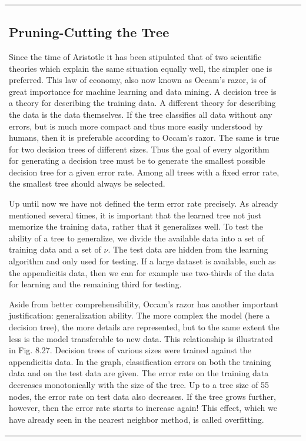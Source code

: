 \documentclass[10pt]{book}
\begin{document}
\begin{center}
\begin{tabular}{|l|l|l|}
\subsection{Pruning-Cutting the Tree}
Since the time of Aristotle it has been stipulated that of two scientific theories which explain the same situation equally well, the simpler one is preferred. This law of economy, also now known as Occam's razor, is of great importance for machine learning and data mining.
A decision tree is a theory for describing the training data. A different theory for describing the data is the data themselves. If the tree classifies all data without any errors, but is much more compact and thus more easily understood by humans, then it is preferable according to Occam's razor. The same is true for two decision trees of different sizes. Thus the goal of every algorithm for generating a decision tree must be to generate the smallest possible decision tree for a given error rate. Among all trees with a fixed error rate, the smallest tree should always be selected.

Up until now we have not defined the term error rate precisely. As already mentioned several times, it is important that the learned tree not just memorize the training data, rather that it generalizes well. To test the ability of a tree to generalize, we divide the available data into a set of training data and a set of $\nu$. The test data are hidden from the learning algorithm and only used for testing. If a large dataset is available, such as the appendicitis data, then we can for example use two-thirds of the data for learning and the remaining third for testing.

Aside from better comprehensibility, Occam's razor has another important justification: generalization ability. The more complex the model (here a decision tree), the more details are represented, but to the same extent the less is the model transferable to new data. This relationship is illustrated in Fig. 8.27. Decision trees of various sizes were trained against the appendicitis data. In the graph, classification errors on both the training data and on the test data are given. The error rate on the training data decreases monotonically with the size of the tree. Up to a tree size of 55 nodes, the error rate on test data also decreases. If the tree grows further, however, then the error rate starts to increase again! This effect, which we have already seen in the nearest neighbor method, is called overfitting.


\end{tabular}
\end{center}
\end{document}
